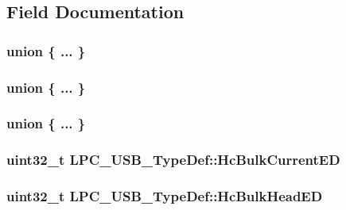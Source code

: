 \subsection{Field Documentation}
\subsubsection[{\texorpdfstring{"@52}{@52}}]{\setlength{\rightskip}{0pt plus 5cm}union \{ ... \} }\hypertarget{structLPC__USB__TypeDef_a62df449ec8ba1fa76cc52bc34ba4ac7d}{}\label{structLPC__USB__TypeDef_a62df449ec8ba1fa76cc52bc34ba4ac7d}
\subsubsection[{\texorpdfstring{"@54}{@54}}]{\setlength{\rightskip}{0pt plus 5cm}union \{ ... \} }\hypertarget{structLPC__USB__TypeDef_a4a739ce9b60832f822fc54bf2035da53}{}\label{structLPC__USB__TypeDef_a4a739ce9b60832f822fc54bf2035da53}
\subsubsection[{\texorpdfstring{"@56}{@56}}]{\setlength{\rightskip}{0pt plus 5cm}union \{ ... \} }\hypertarget{structLPC__USB__TypeDef_a1cee45adab83f9aad936c05e4b8157d1}{}\label{structLPC__USB__TypeDef_a1cee45adab83f9aad936c05e4b8157d1}
\subsubsection[{\texorpdfstring{Hc\+Bulk\+Current\+ED}{HcBulkCurrentED}}]{ uint32\+\_\+t L\+P\+C\+\_\+\+U\+S\+B\+\_\+\+Type\+Def\+::\+Hc\+Bulk\+Current\+ED}\hypertarget{structLPC__USB__TypeDef_ae0c6d7bc85f03346f119d52f7109c2f8}{}\label{structLPC__USB__TypeDef_ae0c6d7bc85f03346f119d52f7109c2f8}
\subsubsection[{\texorpdfstring{Hc\+Bulk\+Head\+ED}{HcBulkHeadED}}]{ uint32\+\_\+t L\+P\+C\+\_\+\+U\+S\+B\+\_\+\+Type\+Def\+::\+Hc\+Bulk\+Head\+ED}\hypertarget{structLPC__USB__TypeDef_ae763ff2aec93c7f8edb6ffc49c3c6ab5}{}\label{structLPC__USB__TypeDef_ae763ff2aec93c7f8edb6ffc49c3c6ab5}
